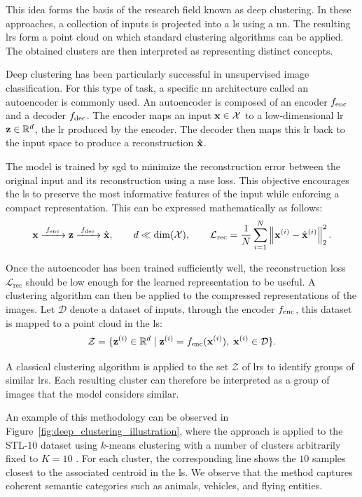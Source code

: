 

This idea forms the basis of the research field known as deep clustering.
In these approaches, a collection of inputs is projected into a \gls{ls} using a \gls{nn}.
The resulting \glspl{lr} form a point cloud on which standard clustering algorithms can be applied.
The obtained clusters are then interpreted as representing distinct concepts.

Deep clustering has been particularly successful in unsupervised image classification.
For this type of task, a specific \gls{nn} architecture called an autoencoder is commonly used.
An autoencoder is composed of an encoder $\Encoder$ and a decoder $\Decoder$.
The encoder maps an input $\mathbf{x} \in \mathcal{X}$ to a low-dimensional \gls{lr} $\mathbf{z} \in \mathbb{R}^d$, the \gls{lr} produced by the encoder.
The decoder then maps this \gls{lr} back to the input space to produce a reconstruction $\hat{\mathbf{x}}$.

The model is trained by \gls{sgd} to minimize the reconstruction error between the original input and its reconstruction using a \gls{mse} loss.
This objective encourages the \gls{ls} to preserve the most informative features of the input while enforcing a compact representation.
This can be expressed mathematically as follows:
\[
\vect{x}
\xrightarrow{\;\Encoder\;}
\vect{z}
\xrightarrow{\;\Decoder\;}
\hat{\vect{x}},
\qquad
d \ll \dim(\mathcal{X}),
\qquad
\mathcal{L}_{\mathrm{rec}}
=
\frac{1}{N}\sum_{i=1}^{N}
\left\|\vect{x}^{(i)}-\hat{\vect{x}}^{(i)}\right\|_2^2.
\]

Once the autoencoder has been trained sufficiently well, the reconstruction loss $\mathcal{L}_{\mathrm{rec}}$ should be low enough for the learned representation to be useful.
A clustering algorithm can then be applied to the compressed representations of the images.
Let $\mathcal{D}$ denote a dataset of inputs, through the encoder $\Encoder$, this dataset is mapped to a point cloud in the \gls{ls}:
\[
\mathcal{Z} = \{\vect{z}^{(i)} \in \mathbb{R}^d \mid \vect{z}^{(i)} = \Encoder(\vect{x}^{(i)}), \; \vect{x}^{(i)} \in \mathcal{D} \}.
\]

A classical clustering algorithm is applied to the set $\mathcal{Z}$ of \glspl{lr} to identify groups of similar \glspl{lr}.
Each resulting cluster can therefore be interpreted as a group of images that the model considers similar.

An example of this methodology can be observed in Figure~\ref{fig:deep_clustering_illustration}, where the approach is applied to the STL-10 dataset \parencite{coates2011analysis} using $k$-means clustering \parencite{macqueen1967multivariate} with a number of clusters arbitrarily fixed to $K = 10$ \parencite{xie_unsupervised_2016}.
For each cluster, the corresponding line shows the $10$ samples closest to the associated centroid in the \gls{ls}.
We observe that the method captures coherent semantic categories such as animals, vehicles, and flying entities.


